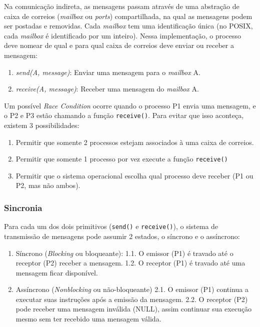 Na comunicação indireta, as mensagens passam através de uma abstração de
caixa de correios (\emph{mailbox} ou \emph{ports}) compartilhada, na
qual as mensagens podem ser postadas e removidas. Cada \emph{mailbox}
tem uma identificação única (no POSIX, cada \emph{mailbox} é
identificado por um inteiro). Nessa implementação, o processo deve
nomear de qual e para qual caixa de correios deve enviar ou receber a
mensagem:

\begin{enumerate}
\def\labelenumi{\arabic{enumi}.}
\tightlist
\item
  \emph{send(A, message)}: Enviar uma mensagem para o \emph{mailbox} A.
\item
  \emph{receive(A, message)}: Receber uma mensagem do \emph{mailbox} A.
\end{enumerate}

Um possível \emph{Race Condition} ocorre quando o processo P1 envia uma
mensagem, e o P2 e P3 estão chamando a função \texttt{receive()}. Para
evitar que isso aconteça, existem 3 possibilidades:

\begin{enumerate}
\def\labelenumi{\arabic{enumi}.}
\tightlist
\item
  Permitir que somente 2 processos estejam associados à uma caixa de
  correios.
\item
  Permitir que somente 1 processo por vez execute a função
  \texttt{receive()}
\item
  Permitir que o sistema operacional escolha qual processo deve receber
  (P1 ou P2, mas não ambos).
\end{enumerate}

\hypertarget{sincronia}{%
\subsubsection{Sincronia}\label{sincronia}}

Para cada um dos dois primitivos (\texttt{send()} e \texttt{receive()}),
o sistema de transmissão de mensagens pode assumir 2 estados, o síncrono
e o assíncrono:

\begin{enumerate}
\def\labelenumi{\arabic{enumi}.}
\item
  Síncrono (\emph{Blocking} ou bloqueante): 1.1. O emissor (P1) é
  travado até o receptor (P2) receber a mensagem. 1.2. O receptor (P1) é
  travado até uma mensagem ficar disponível.
\item
  Assíncrono (\emph{Nonblocking} ou não-bloqueante) 2.1. O emissor (P1)
  continua a executar suas instruções após a emissão da mensagem. 2.2. O
  receptor (P2) pode receber uma mensagem inválida (NULL), assim
  continuar sua execução mesmo sem ter recebido uma mensagem válida.
\end{enumerate}

